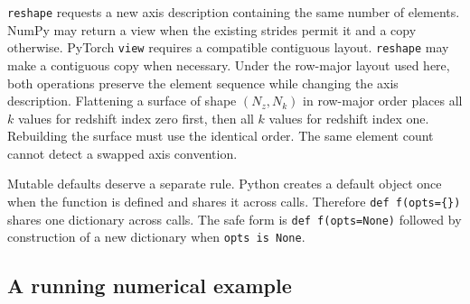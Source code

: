 \documentclass[10pt,aps,prd,twocolumn,nofootinbib]{revtex4-2}
\newcommand{\code}[1]{\texttt{#1}}
\begin{document}
\code{reshape} requests a new axis description containing the same number of
elements.  NumPy may return a view when the existing strides permit it and a
copy otherwise.  PyTorch \code{view} requires a compatible contiguous layout.
\code{reshape} may make a contiguous copy when necessary.  Under the row-major
layout used here, both operations preserve the element sequence while changing
the axis description.  Flattening a surface of shape $(N_z,N_k)$ in row-major order
places all $k$ values for redshift index zero first, then all $k$ values for
redshift index one.  Rebuilding the surface must use the identical order.  The
same element count cannot detect a swapped axis convention.

Mutable defaults deserve a separate rule.  Python creates a default object
once when the function is defined and shares it across calls.  Therefore
\code{def f(opts=\{\})} shares one dictionary across calls.  The safe form is
\code{def f(opts=None)} followed by construction of a new dictionary when
\code{opts is None}.

\subsection{A running numerical example}
\end{document}
